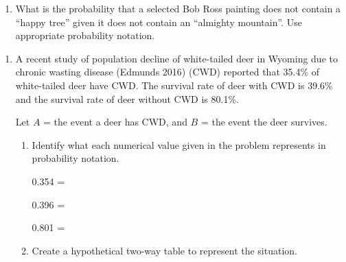 \documentclass[
]{report}
\providecommand{\tightlist}{%
  \setlength{\itemsep}{0pt}\setlength{\parskip}{0pt}}
\begin{document}
\vspace{0.5in}

\begin{enumerate}
\def\labelenumi{\alph{enumi}.}
\setcounter{enumi}{2}
\tightlist
\item
  What is the probability that a selected Bob Ross painting does not contain a ``happy tree'' given it does not contain an ``almighty mountain''. Use appropriate probability notation.
\end{enumerate}

\vspace{0.55in}

\newpage

\begin{enumerate}
\def\labelenumi{\arabic{enumi}.}
\setcounter{enumi}{1}
\item
  A recent study of population decline of white-tailed deer in Wyoming due to chronic wasting disease (Edmunds 2016) (CWD) reported that 35.4\% of white-tailed deer have CWD. The survival rate of deer with CWD is 39.6\% and the survival rate of deer without CWD is 80.1\%.\\
  \vspace{1mm}

  Let \(A\) = the event a deer has CWD, and \(B\) = the event the deer survives.
  \vspace{0.1in}

  \begin{enumerate}
  \def\labelenumii{\alph{enumii}.}
  \item
    Identify what each numerical value given in the problem represents in probability notation.
    \vspace{.1in}

    0.354 =\\
    \vspace{.1in}

    0.396 =\\
    \vspace{.1in}

    0.801 =\\
    \vspace{.1in}
  \item
    Create a hypothetical two-way table to represent the situation.
  \end{enumerate}
\end{enumerate}
\end{document}

